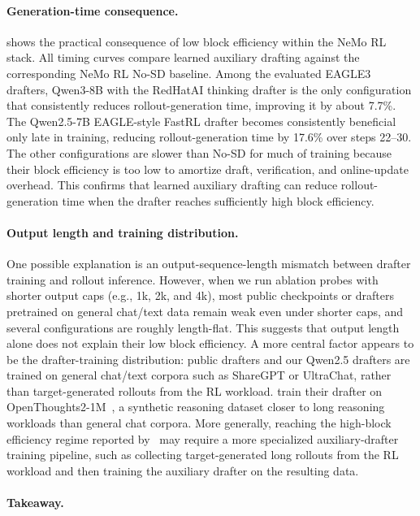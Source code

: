 \documentclass{llmxive}
\providecommand{\learned}{learned auxiliary drafting}
\providecommand{\MAL}{block efficiency}
\begin{document}
\paragraph{Generation-time consequence.}

 shows the practical consequence of low block efficiency within the NeMo RL stack.
All timing curves compare \learned{} against the corresponding NeMo RL No-SD baseline.
Among the evaluated EAGLE3 drafters, Qwen3-8B with the RedHatAI thinking drafter is the only configuration that consistently reduces rollout-generation time, improving it by about 7.7\%.
The Qwen2.5-7B EAGLE-style FastRL drafter becomes consistently beneficial only late in training, reducing rollout-generation time by 17.6\% over steps 22--30.
The other configurations are slower than No-SD for much of training because their \MAL{} is too low to amortize draft, verification, and online-update overhead.
This confirms that learned auxiliary drafting can reduce rollout-generation time when the drafter reaches sufficiently high \MAL{}.


\paragraph{Output length and training distribution.}

One possible explanation is an output-sequence-length mismatch between drafter training and rollout inference.
However, when we run ablation probes with shorter output caps (e.g., 1k, 2k, and 4k), most public checkpoints or drafters pretrained on general chat/text data remain weak even under shorter caps, and several configurations are roughly length-flat.
This suggests that output length alone does not explain their low block efficiency.
A more central factor appears to be the drafter-training distribution: public drafters and our Qwen2.5 drafters are trained on general chat/text corpora such as ShareGPT or UltraChat, rather than target-generated rollouts from the RL workload.
\citet{hu2026taming} train their drafter on OpenThoughts2-1M~\citep{openthoughts2026openthoughts2}, a synthetic reasoning dataset closer to long reasoning workloads than general chat corpora.
More generally, reaching the high-\MAL{} regime reported by~\citet{iso2026accelerating} may require a more specialized auxiliary-drafter training pipeline, such as collecting target-generated long rollouts from the RL workload and then training the auxiliary drafter on the resulting data.


\paragraph{Takeaway.}
\end{document}
